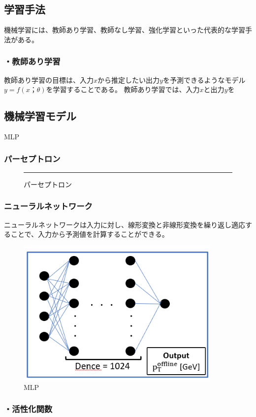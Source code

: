 \subsection{学習手法}
機械学習には、教師あり学習、教師なし学習、強化学習といった代表的な学習手法がある。
\subsubsection{・教師あり学習}
教師あり学習の目標は、入力$x$から推定したい出力$y$を予測できるようなモデル$y = f(x；\theta)$を学習することである。
教師あり学習では、入力$x$と出力$y$を

\subsection{機械学習モデル}
MLP
\subsubsection{パーセプトロン}
\begin{figure}[tb]
  \centering
  \rule{8cm}{6cm}
  \caption{パーセプトロン}
  \label{fig:fit_def}
\end{figure}

\subsubsection{ニューラルネットワーク}
ニューラルネットワークは入力に対し、線形変換と非線形変換を繰り返し適応することで、入力から予測値を計算することができる。
\begin{figure}[tb]
  \centering
  \includegraphics[clip, width=10cm]{fig/4/MLP.png}
  \caption{MLP}
  \label{fig:Resolution}
\end{figure}

\subsubsection{・活性化関数}
